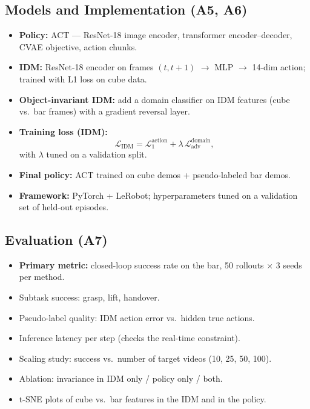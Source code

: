 \documentclass[11pt]{article}
\begin{document}
\subsection{Models and Implementation (A5, A6)}
\begin{itemize}
  \item \textbf{Policy:} ACT --- ResNet-18 image encoder, transformer
    encoder--decoder, CVAE objective, action chunks.
  \item \textbf{IDM:} ResNet-18 encoder on frames $(t, t+1)$ $\rightarrow$ MLP
    $\rightarrow$ 14-dim action; trained with L1 loss on cube data.
  \item \textbf{Object-invariant IDM:} add a domain classifier on IDM features
    (cube vs.\ bar frames) with a gradient reversal layer.
  \item \textbf{Training loss (IDM):}
    \begin{equation*}
      \mathcal{L}_{\text{IDM}} = \mathcal{L}_{1}^{\text{action}}
      + \lambda \, \mathcal{L}_{\text{adv}}^{\text{domain}},
    \end{equation*}
    with $\lambda$ tuned on a validation split.
  \item \textbf{Final policy:} ACT trained on cube demos + pseudo-labeled bar
    demos.
  \item \textbf{Framework:} PyTorch + LeRobot; hyperparameters tuned on a
    validation set of held-out episodes.
\end{itemize}

\subsection{Evaluation (A7)}
\begin{itemize}
  \item \textbf{Primary metric:} closed-loop success rate on the bar,
    50 rollouts $\times$ 3 seeds per method.
  \item Subtask success: grasp, lift, handover.
  \item Pseudo-label quality: IDM action error vs.\ hidden true actions.
  \item Inference latency per step (checks the real-time constraint).
  \item Scaling study: success vs.\ number of target videos
    (10, 25, 50, 100).
  \item Ablation: invariance in IDM only / policy only / both.
  \item t-SNE plots of cube vs.\ bar features in the IDM and in the policy.
\end{itemize}
\end{document}
